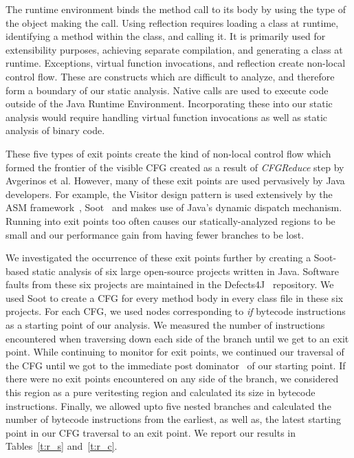 %
The runtime environment binds the method call to its body by using the type of the object making the call.
%
Using reflection requires loading a class at runtime, identifying a method within the class, and calling it.
%
It is primarily used for extensibility purposes, achieving separate compilation, and generating a class at runtime.
%
Exceptions, virtual function invocations, and reflection create non-local control flow.
%
These are constructs which are difficult to analyze, and therefore form a boundary of our static analysis.
%
Native calls are used to execute code outside of the Java Runtime Environment.
%
Incorporating these into our static analysis would require handling virtual function invocations as well as static analysis of binary code.

These five types of exit points create the kind of non-local control flow which formed the frontier of the visible CFG created as a result of \textit{CFGReduce} step by Avgerinos et al.
%
However, many of these exit points are used pervasively by Java developers.
%
For example, the Visitor design pattern is used extensively by the ASM framework~\cite{asm}, Soot~\cite{soot} and makes use of Java\rq s dynamic dispatch mechanism.
%
Running into exit points too often causes our statically-analyzed regions to be small and our performance gain from having fewer branches to be lost.

We investigated the occurrence of these exit points further by creating a Soot-based static analysis of six large open-source projects written in Java.
%
Software faults from these six projects are maintained in the Defects4J~\cite{defects4j} repository.
%
We used Soot to create a CFG for every method body in every class file in these six projects.
%
For each CFG, we used nodes corresponding to \textit{if} bytecode instructions as a starting point of our analysis.
%
We measured the number of instructions encountered when traversing down each side of the branch until we get to an exit point.
%
While continuing to monitor for exit points, we continued our traversal of the CFG until we got to the immediate post dominator~\cite{dragon-book} of our starting point.
%
If there were no exit points encountered on any side of the branch, we considered this region as a pure veritesting region and calculated its size in bytecode instructions.
%
Finally, we allowed upto five nested branches and calculated the number of bytecode instructions from the earliest, as well as, the latest starting point in our CFG traversal to an exit point.
%
We report our results in Tables~\ref{t:r_s} and~\ref{t:r_c}.

